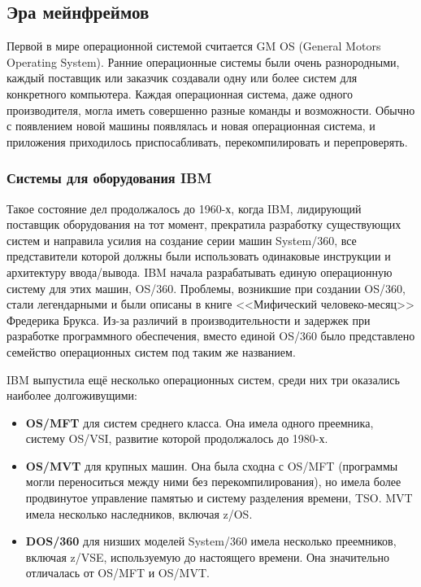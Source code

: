\subsection{Эра мейнфреймов}\label{base:os:history:mainframe}
Первой в мире операционной системой считается GM OS (General Motors Operating System).
Ранние операционные системы были очень разнородными, каждый поставщик или заказчик создавали одну или более систем для конкретного компьютера. Каждая операционная система, даже одного производителя, могла иметь совершенно разные команды и возможности. Обычно с появлением новой машины появлялась и новая операционная система, и приложения приходилось приспосабливать, перекомпилировать и перепроверять.

\subsubsection{Системы для оборудования IBM}\label{base:os:history:ibm}
Такое состояние дел продолжалось до 1960-х, когда IBM, лидирующий поставщик оборудования на тот момент, прекратила разработку существующих систем и направила усилия на создание серии машин System/360, все представители которой должны были использовать одинаковые инструкции и архитектуру ввода/вывода. IBM начала разрабатывать единую операционную систему для этих машин, OS/360. Проблемы, возникшие при создании OS/360, стали легендарными и были описаны в книге <<Мифический человеко-месяц>> Фредерика Брукса. Из-за различий в производительности и задержек при разработке программного обеспечения, вместо единой OS/360 было представлено семейство операционных систем под таким же названием.

IBM выпустила ещё несколько операционных систем, среди них три оказались наиболее долгоживущими:
\begin{itemize}
 \item \textbf{OS/MFT} для систем среднего класса. Она имела одного преемника, систему OS/VSI, развитие которой продолжалось до 1980-х.
 \item \textbf{OS/MVT} для крупных машин. Она была сходна с OS/MFT (программы могли переноситься между ними без перекомпилирования), но имела более продвинутое управление памятью и систему разделения времени, TSO. MVT имела несколько наследников, включая z/OS.
 \item \textbf{DOS/360} для низших моделей System/360 имела несколько преемников, включая z/VSE, используемую до настоящего времени. Она значительно отличалась от OS/MFT и OS/MVT.
\end{itemize}

